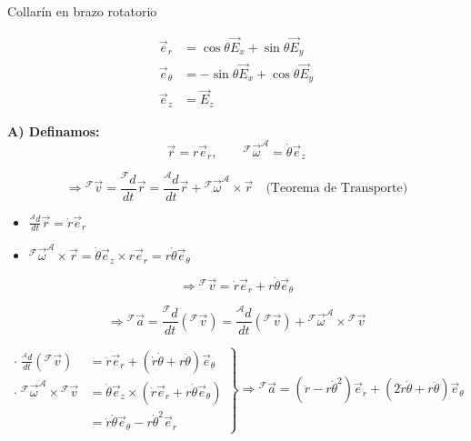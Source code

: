 \begin{solucion}{Collarín en brazo rotatorio}
\begin{minipage}{0.55\textwidth}
\end{minipage}
\begin{minipage}{0.42\textwidth}
\[
\begin{aligned}
\vec{e}_r &= \cos\theta \vec{E}_x + \sin\theta \vec{E}_y \\
\vec{e}_\theta &= -\sin\theta \vec{E}_x + \cos\theta \vec{E}_y \\
\vec{e}_z &= \vec{E}_z
\end{aligned}
\]
\end{minipage}

\vspace{0.8cm}

\noindent\textbf{A) Definamos:} 
\[
\vec{r} = r\vec{e}_r, \qquad {}^{\mathcal{F}}\vec{\omega}^{\mathcal{A}} = \dot{\theta}\vec{e}_z
\]

\[
\Rightarrow {}^{\mathcal{F}}\vec{v} = \frac{{}^{\mathcal{F}}d}{dt}\vec{r} = \frac{{}^{\mathcal{A}}d}{dt}\vec{r} + {}^{\mathcal{F}}\vec{\omega}^{\mathcal{A}} \times \vec{r} \quad \text{(Teorema de Transporte)}
\]

\begin{itemize}
    \item $\frac{{}^{\mathcal{A}}d}{dt}\vec{r} = \dot{r}\vec{e}_r$
    \item ${}^{\mathcal{F}}\vec{\omega}^{\mathcal{A}} \times \vec{r} = \dot{\theta}\vec{e}_z \times r\vec{e}_r = r\dot{\theta}\vec{e}_\theta$
\end{itemize}

\[
\Rightarrow \boxed{{}^{\mathcal{F}}\vec{v} = \dot{r}\vec{e}_r + r\dot{\theta}\vec{e}_\theta}
\]

\[
\Rightarrow {}^{\mathcal{F}}\vec{a} = \frac{{}^{\mathcal{F}}d}{dt}({}^{\mathcal{F}}\vec{v}) = \frac{{}^{\mathcal{A}}d}{dt}({}^{\mathcal{F}}\vec{v}) + {}^{\mathcal{F}}\vec{\omega}^{\mathcal{A}} \times {}^{\mathcal{F}}\vec{v}
\]

\[
\left.
\begin{aligned}
\cdot \; \frac{{}^{\mathcal{A}}d}{dt}({}^{\mathcal{F}}\vec{v}) &= \ddot{r}\vec{e}_r + (\dot{r}\dot{\theta} + r\ddot{\theta})\vec{e}_\theta \\[4pt]
\cdot \; {}^{\mathcal{F}}\vec{\omega}^{\mathcal{A}} \times {}^{\mathcal{F}}\vec{v} &= \dot{\theta}\vec{e}_z \times (\dot{r}\vec{e}_r + r\dot{\theta}\vec{e}_\theta) \\
&= \dot{r}\dot{\theta}\vec{e}_\theta - r\dot{\theta}^2\vec{e}_r
\end{aligned}
\right\} 
\Rightarrow \boxed{{}^{\mathcal{F}}\vec{a} = (\ddot{r} - r\dot{\theta}^2)\vec{e}_r + (2\dot{r}\dot{\theta} + r\ddot{\theta})\vec{e}_\theta}
\]


\end{solucion}
